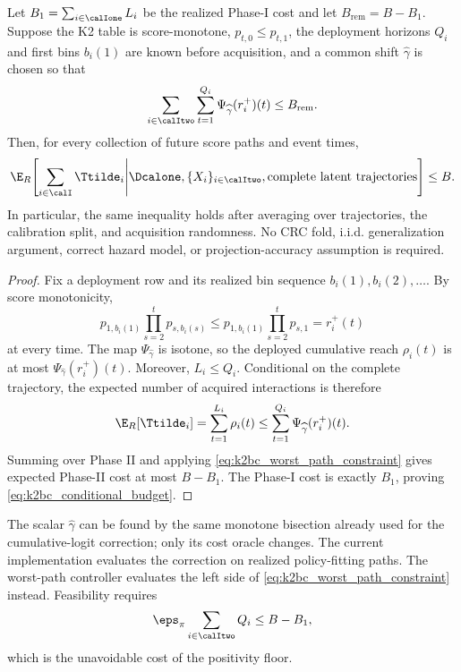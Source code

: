 \begin{theorem}
\label{thm:k2bc_worst_path}
Let $B_1=\sum_{i\in\calIone}L_i$ be the realized Phase-I cost and let
$B_{\mathrm{rem}}=B-B_1$.  Suppose the K2 table is score-monotone,
$p_{t,0}\leq p_{t,1}$, the deployment horizons $Q_i$ and first bins $b_i(1)$
are known before acquisition, and a common shift $\widehat\gamma$ is chosen so
that
\begin{equation}
    \sum_{i\in\calItwo}\sum_{t=1}^{Q_i}
      \Psi_{\widehat\gamma}(r_i^+)(t)
    \leq B_{\mathrm{rem}}.
    \label{eq:k2bc_worst_path_constraint}
\end{equation}
Then, for every collection of future score paths and event times,
\begin{equation}
    \E_R\!\left[
       \sum_{i\in\calI}\Ttilde_i
       \middle|
       \Dcalone,\{X_i\}_{i\in\calItwo},
       \text{complete latent trajectories}
    \right]
    \leq B.
    \label{eq:k2bc_conditional_budget}
\end{equation}
In particular, the same inequality holds after averaging over trajectories,
the calibration split, and acquisition randomness.  No CRC fold, i.i.d.
generalization argument, correct hazard model, or projection-accuracy
assumption is required.
\end{theorem}

\begin{proof}
Fix a deployment row and its realized bin sequence $b_i(1),b_i(2),\ldots$.
By score monotonicity,
\begin{equation}
    p_{1,b_i(1)}\prod_{s=2}^{t}p_{s,b_i(s)}
    \leq p_{1,b_i(1)}\prod_{s=2}^{t}p_{s,1}
    =r_i^+(t)
\end{equation}
at every time.  The map $\Psi_{\widehat\gamma}$ is isotone, so the deployed
cumulative reach $\rho_i(t)$ is at most
$\Psi_{\widehat\gamma}(r_i^+)(t)$.  Moreover,
$L_i\leq Q_i$.  Conditional on the complete trajectory, the expected number
of acquired interactions is therefore
\begin{equation}
    \E_R[\Ttilde_i]
    =\sum_{t=1}^{L_i}\rho_i(t)
    \leq\sum_{t=1}^{Q_i}
      \Psi_{\widehat\gamma}(r_i^+)(t).
\end{equation}
Summing over Phase II and applying
\eqref{eq:k2bc_worst_path_constraint} gives expected Phase-II cost at most
$B-B_1$.  The Phase-I cost is exactly $B_1$, proving
\eqref{eq:k2bc_conditional_budget}.
\end{proof}

The scalar $\widehat\gamma$ can be found by the same monotone bisection already
used for the cumulative-logit correction; only its cost oracle changes.  The
current implementation evaluates the correction on realized policy-fitting
paths.  The worst-path controller evaluates the left side of
\eqref{eq:k2bc_worst_path_constraint} instead.  Feasibility requires
\begin{equation}
    \eps_\pi\sum_{i\in\calItwo}Q_i\leq B-B_1,
\end{equation}
which is the unavoidable cost of the positivity floor.

